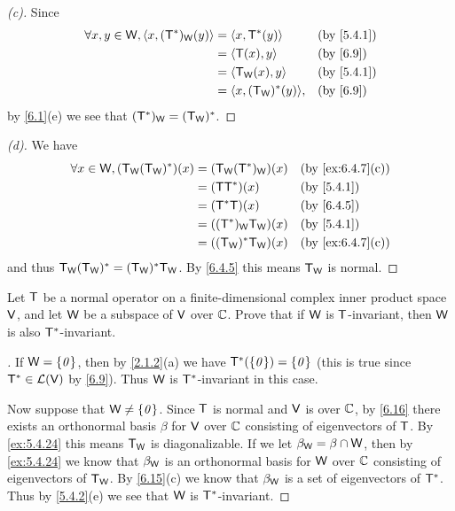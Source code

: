 \begin{proof}[(c)]
	Since
	\begin{align*}
		\forall x, y \in \W, \inn{x, (\T^*)_{\W}(y)} & = \inn{x, \T^*(y)}         &  & \by{5.4.1} \\
		                                             & = \inn{\T(x), y}           &  & \by{6.9}   \\
		                                             & = \inn{\T_{\W}(x), y}      &  & \by{5.4.1} \\
		                                             & = \inn{x, (\T_{\W})^*(y)}, &  & \by{6.9}
	\end{align*}
	by \cref{6.1}(e) we see that \((\mathsf{T}^*)_{\mathsf{W}} = (\mathsf{T}_{\mathsf{W}})^*\).
\end{proof}

\begin{proof}[(d)]
	We have
	\begin{align*}
		\forall x \in \W, (\T_{\W} (\T_{\W})^*)(x) & = (\T_{\W} (\T^*)_{\W})(x) &  & \by{ex:6.4.7}[c] \\
		                                           & = (\T \T^*)(x)             &  & \by{5.4.1}       \\
		                                           & = (\T^* \T)(x)             &  & \by{6.4.5}       \\
		                                           & = ((\T^*)_{\W} \T_{\W})(x) &  & \by{5.4.1}       \\
		                                           & = ((\T_{\W})^* \T_{\W})(x) &  & \by{ex:6.4.7}[c]
	\end{align*}
	and thus \(\mathsf{T}_{\mathsf{W}} (\mathsf{T}_{\mathsf{W}})^* = (\mathsf{T}_{\mathsf{W}})^* \mathsf{T}_{\mathsf{W}}\).
	By \cref{6.4.5} this means \(\mathsf{T}_{\mathsf{W}}\) is normal.
\end{proof}

\begin{ex}\label{ex:6.4.8}
	Let \(\mathsf{T}\) be a normal operator on a finite-dimensional complex inner product space \(\mathsf{V}\), and let \(\mathsf{W}\) be a subspace of \(\mathsf{V}\) over \(\mathbb{C}\).
	Prove that if \(\mathsf{W}\) is \(\mathsf{T}\)-invariant, then \(\mathsf{W}\) is also \(\mathsf{T}^*\)-invariant.
\end{ex}

\begin{proof}[]
	If \(\mathsf{W} = \left\lbrace\mathit{0}\right\rbrace\), then by \cref{2.1.2}(a) we have \(\mathsf{T}^*(\left\lbrace\mathit{0}\right\rbrace) = \left\lbrace\mathit{0}\right\rbrace\) (this is true since \(\mathsf{T}^* \in \mathcal{L}(\mathsf{V})\) by \cref{6.9}).
	Thus \(\mathsf{W}\) is \(\mathsf{T}^*\)-invariant in this case.

	Now suppose that \(\mathsf{W} \neq \left\lbrace\mathit{0}\right\rbrace\).
	Since \(\mathsf{T}\) is normal and \(\mathsf{V}\) is over \(\mathbb{C}\), by \cref{6.16} there exists an orthonormal basis \(\beta\) for \(\mathsf{V}\) over \(\mathbb{C}\) consisting of eigenvectors of \(\mathsf{T}\).
	By \cref{ex:5.4.24} this means \(\mathsf{T}_{\mathsf{W}}\) is diagonalizable.
	If we let \(\beta_{\mathsf{W}} = \beta \cap \mathsf{W}\), then by \cref{ex:5.4.24} we know that \(\beta_{\mathsf{W}}\) is an orthonormal basis for \(\mathsf{W}\) over \(\mathbb{C}\) consisting of eigenvectors of \(\mathsf{T}_{\mathsf{W}}\).
	By \cref{6.15}(c) we know that \(\beta_{\mathsf{W}}\) is a set of eigenvectors of \(\mathsf{T}^*\).
	Thus by \cref{5.4.2}(e) we see that \(\mathsf{W}\) is \(\mathsf{T}^*\)-invariant.
\end{proof}

